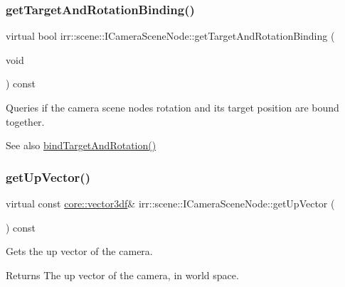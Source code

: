 \subsubsection{\texorpdfstring{get\+Target\+And\+Rotation\+Binding()}{getTargetAndRotationBinding()}\hspace{0.1cm}{\footnotesize\ttfamily [2/2]}}
{\footnotesize\ttfamily virtual bool irr\+::scene\+::\+I\+Camera\+Scene\+Node\+::get\+Target\+And\+Rotation\+Binding (\begin{DoxyParamCaption}\item[{void}]{ }\end{DoxyParamCaption}) const\hspace{0.3cm}{\ttfamily [pure virtual]}}



Queries if the camera scene node\textquotesingle{}s rotation and its target position are bound together. 

\begin{DoxySeeAlso}{See also}
\hyperlink{classirr_1_1scene_1_1ICameraSceneNode_ad8785d7b2f730933a8d4425ac54e7205}{bind\+Target\+And\+Rotation()} 
\end{DoxySeeAlso}
\mbox{\label{classirr_1_1scene_1_1ICameraSceneNode_a0dfb97859302021b9a44f2ead59fa230}} 
\subsubsection{\texorpdfstring{get\+Up\+Vector()}{getUpVector()}\hspace{0.1cm}{\footnotesize\ttfamily [1/2]}}
{\footnotesize\ttfamily virtual const \hyperlink{namespaceirr_1_1core_ae6e2b2a6c552833ebbd5b7463d03586b}{core\+::vector3df}\& irr\+::scene\+::\+I\+Camera\+Scene\+Node\+::get\+Up\+Vector (\begin{DoxyParamCaption}{ }\end{DoxyParamCaption}) const\hspace{0.3cm}{\ttfamily [pure virtual]}}



Gets the up vector of the camera. 

\begin{DoxyReturn}{Returns}
The up vector of the camera, in world space. 
\end{DoxyReturn}
\mbox{\label{classirr_1_1scene_1_1ICameraSceneNode_a0dfb97859302021b9a44f2ead59fa230}} 
